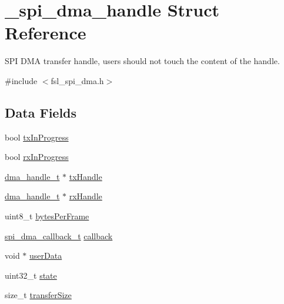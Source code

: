 \hypertarget{struct__spi__dma__handle}{}\section{\+\_\+spi\+\_\+dma\+\_\+handle Struct Reference}
\label{struct__spi__dma__handle}


S\+PI D\+MA transfer handle, users should not touch the content of the handle.  




{\ttfamily \#include $<$fsl\+\_\+spi\+\_\+dma.\+h$>$}

\subsection*{Data Fields}
\begin{DoxyCompactItemize}
\item 
bool \mbox{\hyperlink{struct__spi__dma__handle_a2f86d16ba2ed9287aa249d61fdbd8dc5}{tx\+In\+Progress}}
\item 
bool \mbox{\hyperlink{struct__spi__dma__handle_a3fd0074ef5f28778f3a3a4b31a095953}{rx\+In\+Progress}}
\item 
\mbox{\hyperlink{group__dma_gac4a65788d7e5762d16a41a50b2cd7956}{dma\+\_\+handle\+\_\+t}} $\ast$ \mbox{\hyperlink{struct__spi__dma__handle_ace1f07669b8bb367c0434b8a5e82073e}{tx\+Handle}}
\item 
\mbox{\hyperlink{group__dma_gac4a65788d7e5762d16a41a50b2cd7956}{dma\+\_\+handle\+\_\+t}} $\ast$ \mbox{\hyperlink{struct__spi__dma__handle_ac7ec064148024aecf3310655c0eb79a3}{rx\+Handle}}
\item 
uint8\+\_\+t \mbox{\hyperlink{struct__spi__dma__handle_a34a1eb6e4f11adc3ae8969e5ba57fee0}{bytes\+Per\+Frame}}
\item 
\mbox{\hyperlink{group__spi__dma__driver_gacbd157eee3bc09fe3156002bf242d15f}{spi\+\_\+dma\+\_\+callback\+\_\+t}} \mbox{\hyperlink{struct__spi__dma__handle_a13ae89c943e013f5d86912809bf15998}{callback}}
\item 
void $\ast$ \mbox{\hyperlink{struct__spi__dma__handle_a2e294dd14122c554baa0665072b4ca7a}{user\+Data}}
\item 
uint32\+\_\+t \mbox{\hyperlink{struct__spi__dma__handle_a1b0c7bd4d79798ef4e0ce23894c9aeb2}{state}}
\item 
size\+\_\+t \mbox{\hyperlink{struct__spi__dma__handle_a10e6d1f095e525fa85ffe957081ed7a7}{transfer\+Size}}
\end{DoxyCompactItemize}



